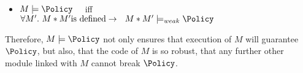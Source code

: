 \begin{definition} ~ ~  

\begin{itemize}
\item
$M  \models \Policy$ \  \  iff \\ 
$\forall M'. \ M*M' \mbox{is defined} \rightarrow  \ \  M*M'  \models_{weak} \Policy$
\end{itemize}
\end{definition}


Therefore,   $M \models \Policy$ not only ensures that
execution of $M$ will guarantee $\Policy$, but also, that the code of
$M$ is so robust,  that any further other module
linked with $M$ cannot break $\Policy$. 
%
%





